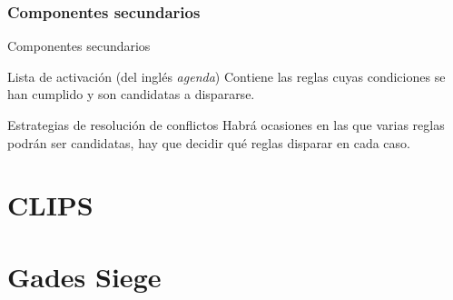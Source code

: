 \documentclass[smaller,spanish,xcolor=svgnames]{beamer}
\begin{document}
\subsubsection{Componentes secundarios}

\begin{frame}{Componentes secundarios}
    \begin{block}{Lista de activación (del inglés \textit{agenda})}
      Contiene las reglas cuyas condiciones se han cumplido y son candidatas a
      dispararse.
    \end{block}

    \begin{block}{Estrategias de resolución de conflictos}
      Habrá ocasiones en las que varias reglas podrán ser candidatas, hay que
      decidir qué reglas disparar en cada caso.
    \end{block}
  
\end{frame}

\section{CLIPS}

\section{Gades Siege}
\end{document}
